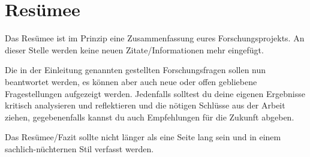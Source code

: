 \chapter{Resümee}
\label{cha:final}

Das Resümee ist im Prinzip eine Zusammenfassung eures Forschungsprojekts. An dieser Stelle werden keine neuen Zitate/Informationen mehr eingefügt. 

Die in der Einleitung genannten gestellten Forschungsfragen sollen nun beantwortet werden, es können aber auch neue oder offen gebliebene Fragestellungen aufgezeigt werden. Jedenfalls solltest du deine eigenen Ergebnisse kritisch analysieren und reflektieren und die nötigen Schlüsse aus der Arbeit ziehen, gegebenenfalls kannst du auch Empfehlungen für die Zukunft abgeben. 

Das Resümee/Fazit sollte nicht länger als eine Seite lang sein und in einem sachlich-nüchternen Stil verfasst werden.